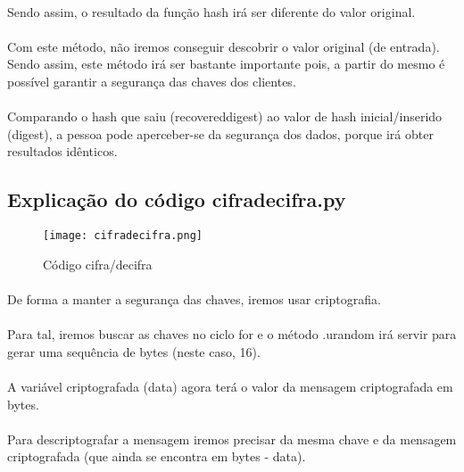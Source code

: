 \documentclass[a4paper,11pt,onecolumn,oneside]{article}
\begin{document}
\paragraph{ }
Sendo assim, o resultado da função hash irá ser diferente do valor original.
\paragraph{ }
Com este método, não iremos conseguir descobrir o valor original (de entrada). Sendo assim, este método irá ser bastante importante pois, a partir do mesmo é possível garantir a segurança das chaves dos clientes.
\paragraph{ }
Comparando o hash que saiu (recovered\textunderscore digest) ao valor de hash inicial/inserido (digest), a pessoa pode aperceber-se da segurança dos dados, porque irá obter resultados idênticos.




\newpage
\subsection{Explicação do código cifradecifra.py}

\begin{figure} [h]
\center
\texttt{[image: cifradecifra.png]}
\caption{Código cifra/decifra}
\label{cifra/decifra}
\end{figure}
\paragraph{ }
De forma a manter a segurança das chaves, iremos usar criptografia.
\paragraph{ }
Para tal, iremos buscar as chaves no ciclo for e o método .urandom irá servir para gerar uma sequência de bytes (neste caso, 16).
\paragraph{ }
A variável criptografada (data) agora terá o valor da mensagem criptografada em bytes.
\paragraph{ }
Para descriptografar a mensagem iremos precisar da mesma chave e da mensagem criptografada (que ainda se encontra em bytes - data).
\end{document}
